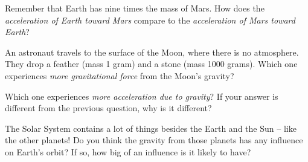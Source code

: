\documentclass[12pt]{article}
\begin{document}
Remember that Earth has nine times the mass of Mars. How does the {\it acceleration of Earth toward Mars} compare to the {\it acceleration of Mars toward Earth}?

\vspace{.7in}
	
An astronaut travels to the surface of the Moon, where there is no atmosphere. They drop a feather (mass 1 gram) and a stone (mass 1000 grams). Which one experiences {\it more gravitational force} from the Moon's gravity?

\vspace{.7in}

Which one experiences {\it more acceleration due to gravity}? If your answer is different from the previous question, why is it different?

\vspace{1in}

The Solar System contains a lot of things besides the Earth and the Sun -- like the other planets! Do you think the gravity from those planets has any influence on Earth's orbit? If so, how big of an influence is it likely to have?
	
	
\end{document}
